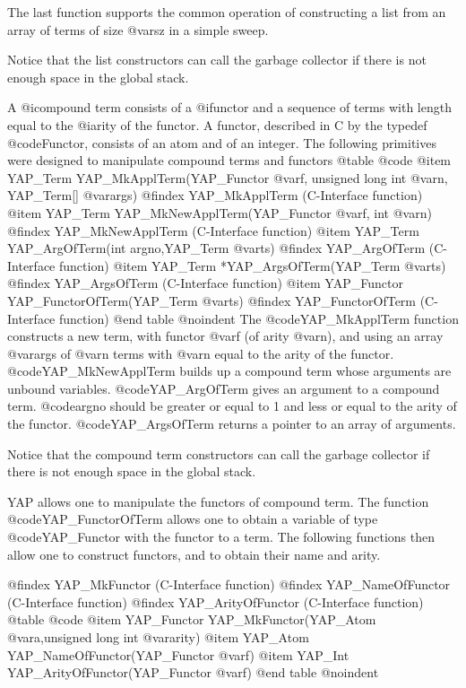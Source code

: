 The last function supports the common operation of constructing a list from an
array of terms of size @var{sz} in a simple sweep.

Notice that the list constructors can call the garbage collector if
there is not enough space in the global stack. 

A @i{compound} term consists of a @i{functor} and a sequence of terms with
length equal to the @i{arity} of the functor. A functor, described in C by
the typedef @code{Functor}, consists of an atom and of an integer.
The following primitives were designed to manipulate compound terms and 
functors
@table @code
@item      YAP_Term     YAP_MkApplTerm(YAP_Functor @var{f}, unsigned long int @var{n}, YAP_Term[] @var{args})
@findex YAP_MkApplTerm (C-Interface function)
@item      YAP_Term     YAP_MkNewApplTerm(YAP_Functor @var{f}, int @var{n})
@findex YAP_MkNewApplTerm (C-Interface function)
@item      YAP_Term     YAP_ArgOfTerm(int argno,YAP_Term @var{ts})
@findex YAP_ArgOfTerm (C-Interface function)
 @item     YAP_Term    *YAP_ArgsOfTerm(YAP_Term @var{ts})
@findex YAP_ArgsOfTerm (C-Interface function)
 @item     YAP_Functor  YAP_FunctorOfTerm(YAP_Term @var{ts})
@findex YAP_FunctorOfTerm (C-Interface function)
@end table
@noindent
The @code{YAP_MkApplTerm} function constructs a new term, with functor
@var{f} (of arity @var{n}), and using an array @var{args} of @var{n}
terms with @var{n} equal to the arity of the
functor. @code{YAP_MkNewApplTerm} builds up a compound term whose
arguments are unbound variables. @code{YAP_ArgOfTerm} gives an argument
to a compound term. @code{argno} should be greater or equal to 1 and
less or equal to the arity of the functor.  @code{YAP_ArgsOfTerm}
returns a pointer to an array of arguments.

Notice that the compound term constructors can call the garbage
collector if there is not enough space in the global stack.

YAP allows one to manipulate the functors of compound term. The function
@code{YAP_FunctorOfTerm} allows one to obtain a variable of type
@code{YAP_Functor} with the functor to a term. The following functions
then allow one to construct functors, and to obtain their name and arity. 

@findex YAP_MkFunctor (C-Interface function)
@findex YAP_NameOfFunctor (C-Interface function)
@findex YAP_ArityOfFunctor (C-Interface function)
@table @code
 @item     YAP_Functor  YAP_MkFunctor(YAP_Atom @var{a},unsigned long int @var{arity})
 @item     YAP_Atom     YAP_NameOfFunctor(YAP_Functor @var{f})
  @item    YAP_Int      YAP_ArityOfFunctor(YAP_Functor @var{f})
@end table
@noindent

